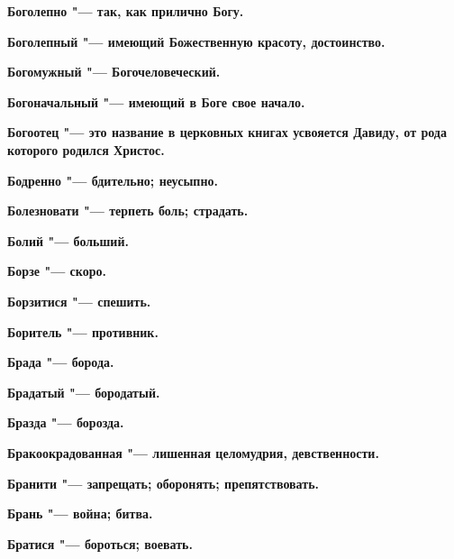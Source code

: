 \bfseries Боголепно \normalfont{} "--- так, как прилично Богу. 




\bfseries Боголепный \normalfont{} "--- имеющий Божественную красоту, достоинство. 




\bfseries Богомужный \normalfont{} "--- Богочеловеческий. 




\bfseries Богоначальный \normalfont{} "--- имеющий в Боге свое начало. 




\bfseries Богоотец \normalfont{} "--- это название в церковных книгах усвояется Давиду, от рода которого родился Христос. 




\bfseries Бодренно \normalfont{} "--- бдительно; неусыпно. 




\bfseries Болезновати \normalfont{} "--- терпеть боль; страдать. 




\bfseries Болий \normalfont{} "--- больший. 




\bfseries Борзе \normalfont{} "--- скоро. 




\bfseries Борзитися \normalfont{} "--- спешить. 




\bfseries Боритель \normalfont{} "--- противник. 




\bfseries Брада \normalfont{} "--- борода. 




\bfseries Брадатый \normalfont{} "--- бородатый. 




\bfseries Бразда \normalfont{} "--- борозда. 




\bfseries Бракоокрадованная \normalfont{} "--- лишенная целомудрия, девственности. 




\bfseries Бранити \normalfont{} "--- запрещать; оборонять; препятствовать. 




\bfseries Брань \normalfont{} "--- война; битва. 




\bfseries Братися \normalfont{} "--- бороться; воевать. 





